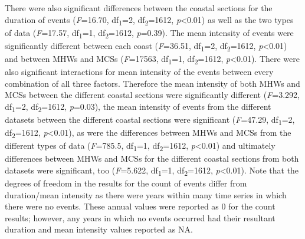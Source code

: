 \documentclass[a4paper,10pt,review]{elsarticle}
\begin{document}
There were also significant differences between the coastal sections for the duration of events (\emph{F}=16.70, df\textsubscript{1}=2, df\textsubscript{2}=1612, \emph{p}<0.01) as well as the two types of data (\emph{F}=17.57, df\textsubscript{1}=1, df\textsubscript{2}=1612, \emph{p}=0.39). The mean intensity of events were significantly different between each coast (\emph{F}=36.51, df\textsubscript{1}=2, df\textsubscript{2}=1612, \emph{p}<0.01) and between MHWs and MCSs (\emph{F}=17563, df\textsubscript{1}=1, df\textsubscript{2}=1612, \emph{p}<0.01). There were also significant interactions for mean intensity of the events between every combination of all three factors. Therefore the mean intensity of both MHWs and MCSs between the different coastal sections were significantly different (\emph{F}=3.292, df\textsubscript{1}=2, df\textsubscript{2}=1612, \emph{p}=0.03), the mean intensity of events from the different datasets between the different coastal sections were significant (\emph{F}=47.29, df\textsubscript{1}=2, df\textsubscript{2}=1612, \emph{p}<0.01), as were the differences between MHWs and MCSs from the different types of data (\emph{F}=785.5, df\textsubscript{1}=1, df\textsubscript{2}=1612, \emph{p}<0.01) and ultimately differences between MHWs and MCSs for the different coastal sections from both datasets were significant, too (\emph{F}=5.622, df\textsubscript{1}=1, df\textsubscript{2}=1612, \emph{p}<0.01). Note that the degrees of freedom in the results for the count of events differ from duration/mean intensity as there were years within many time series in which there were no events. These annual values were reported as 0 for the count results; however, any years in which no events occurred had their resultant duration and mean intensity values reported as NA.
\end{document}
